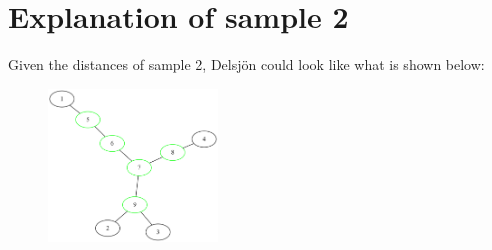 \section*{Explanation of sample 2}
Given the distances of sample 2, Delsjön could look like what is shown below: 
\begin{center}
  \begin{figure}[h]
    \centering
    \includegraphics[width=0.4\textwidth]{sample-2.png}
  \end{figure}
\end{center}